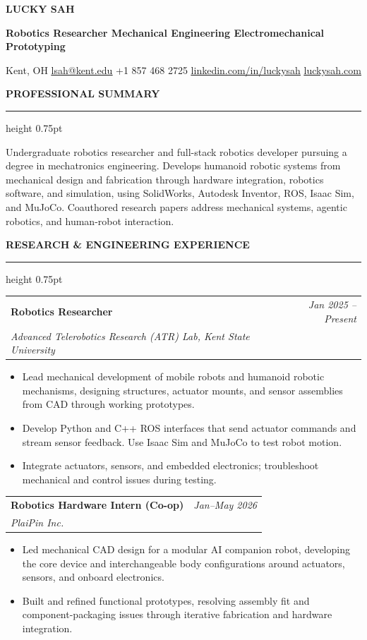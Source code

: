 \documentclass[10pt,letterpaper]{article}
\makeatletter
\newcommand{\resumesection}[1]{%
  \par\vspace{7.5pt}%
  {\fontsize{10.5}{11}\selectfont\bfseries\MakeUppercase{#1}}\par
  \vspace{1pt}\hrule height 0.75pt\vspace{4.5pt}%
}
\newcommand{\firstresumesection}[1]{%
  \par\vspace{7pt}%
  {\fontsize{10.5}{11}\selectfont\bfseries\MakeUppercase{#1}}\par
  \vspace{1pt}\hrule height 0.75pt\vspace{6.5pt}%
}
\newcommand{\roleentry}[3]{%
  \begin{tabularx}{\linewidth}{@{}>{\raggedright\arraybackslash}X@{\hspace{1em}}>{\raggedleft\arraybackslash}r@{}}
    \textbf{#1} & \textit{#3} \\
    \textit{#2} &
  \end{tabularx}\vspace{-0.5pt}%
}
\newenvironment{resumelist}{%
  \begin{itemize}[
    leftmargin=0.15in,
    label=\textbullet,
    labelsep=0.05in,
    topsep=1.2pt,
    partopsep=0pt,
    parsep=0pt,
    itemsep=1.2pt
  ]
}{\end{itemize}\vspace{0pt}}
\makeatother
\begin{document}
\fontsize{10}{11.5}\selectfont
\raggedright

\begin{center}
  {\fontsize{17}{19}\selectfont\bfseries LUCKY SAH}\par
  \vspace{2pt}
  {\fontsize{9.5}{10.5}\selectfont\bfseries
    Robotics Researcher \textbar{} Mechanical Engineering \textbar{} Electromechanical Prototyping
  }\par
  \vspace{3pt}
  Kent, OH \textbar{} \href{mailto:lsah@kent.edu}{\underline{lsah@kent.edu}}
  \textbar{} +1 857 468 2725
  \textbar{} \href{https://www.linkedin.com/in/luckysah/}{\underline{linkedin.com/in/luckysah}}
  \textbar{} \href{https://luckysah.com}{\underline{luckysah.com}}
\end{center}
\vspace{1pt}

\firstresumesection{Professional Summary}
Undergraduate robotics researcher and full-stack robotics developer pursuing a degree in mechatronics engineering.
Develops humanoid robotic systems from mechanical design and fabrication through hardware integration, robotics software,
and simulation, using SolidWorks, Autodesk Inventor, ROS, Isaac Sim, and MuJoCo.
Coauthored research papers address mechanical systems, agentic robotics, and human-robot interaction.

\resumesection{Research \& Engineering Experience}
\roleentry{Robotics Researcher}{Advanced Telerobotics Research (ATR) Lab, Kent State University}{Jan 2025 -- Present}
\begin{resumelist}
  \item Lead mechanical development of mobile robots and humanoid robotic mechanisms, designing structures, actuator mounts, and sensor assemblies from CAD through working prototypes.
  \item Develop Python and C++ ROS interfaces that send actuator commands and stream sensor feedback. Use Isaac Sim and MuJoCo to test robot motion.
  \item Integrate actuators, sensors, and embedded electronics; troubleshoot mechanical and control issues during testing.
\end{resumelist}

\vspace{3pt}
\roleentry{Robotics Hardware Intern (Co-op)}{PlaiPin Inc.}{Jan--May 2026}
\begin{resumelist}
  \item Led mechanical CAD design for a modular AI companion robot, developing the core device and interchangeable body configurations around actuators, sensors, and onboard electronics.
  \item Built and refined functional prototypes, resolving assembly fit and component-packaging issues through iterative fabrication and hardware integration.
\end{resumelist}
\end{document}

